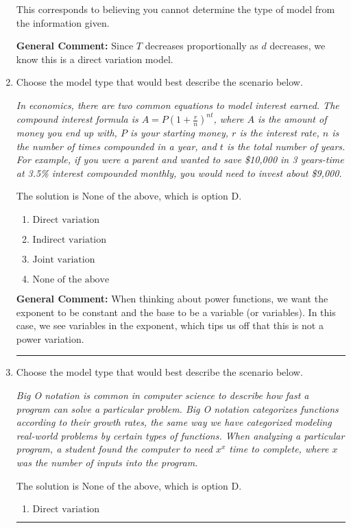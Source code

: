 \documentclass{extbook}[14pt]
\newcommand{\litem}[1]{\item #1

\rule{\textwidth}{0.4pt}}
\begin{document}
\begin{enumerate}
{\begin{enumerate}[label=\Alph*.]
This corresponds to believing you cannot determine the type of model from the information given.
\end{enumerate}

\textbf{General Comment:} Since $T$ decreases proportionally as $d$ decreases, we know this is a direct variation model.
}
\litem{
Choose the model type that would best describe the scenario below.

\begin{center}
    \textit{ In economics, there are two common equations to model interest earned. The compound interest formula is $A = P (1 + \frac{r}{n})^{nt}$, where $A$ is the amount of money you end up with, $P$ is your starting money, $r$ is the interest rate, $n$ is the number of times compounded in a year, and $t$ is the total number of years. For example, if you were a parent and wanted to save \$10,000 in 3 years-time at 3.5\% interest compounded monthly, you would need to invest about \$9,000. }
\end{center}
The solution is \( \text{None of the above} \), which is option D.\begin{enumerate}[label=\Alph*.]
\item \( \text{Direct variation} \)


\item \( \text{Indirect variation} \)


\item \( \text{Joint variation} \)


\item \( \text{None of the above} \)


\end{enumerate}

\textbf{General Comment:} When thinking about power functions, we want the exponent to be constant and the base to be a variable (or variables). In this case, we see variables in the exponent, which tips us off that this is not a power variation.
}
\litem{
Choose the model type that would best describe the scenario below.

\begin{center}
    \textit{ Big O notation is common in computer science to describe how fast a program can solve a particular problem. Big O notation categorizes functions according to their growth rates, the same way we have categorized modeling real-world problems by certain types of functions. When analyzing a particular program, a student found the computer to need $x^x$ time to complete, where $x$ was the number of inputs into the program. }
\end{center}
The solution is \( \text{None of the above} \), which is option D.\begin{enumerate}[label=\Alph*.]
\item \( \text{Direct variation} \)



\end{enumerate}}
\end{enumerate}
\end{document}
